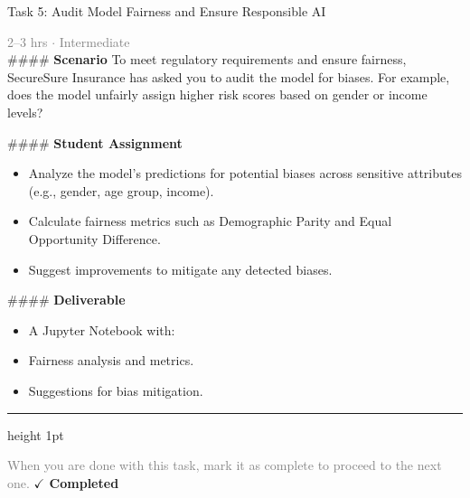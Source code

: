 \documentclass[10pt,a4paper]{article}
\begin{document}
\begin{taskbox}{Task 5: Audit Model Fairness and Ensure Responsible AI}

    {\small \textcolor{gray}{2--3 hrs $\cdot$ Intermediate}}\\[12pt]

    \#\#\#\# \textbf{Scenario}
To meet regulatory requirements and ensure fairness, SecureSure Insurance has asked you to audit the model for biases. For example, does the model unfairly assign higher risk scores based on gender or income levels?

\#\#\#\# \textbf{Student Assignment}
\begin{itemize}
    \item Analyze the model’s predictions for potential biases across sensitive attributes (e.g., gender, age group, income).
    \item Calculate fairness metrics such as Demographic Parity and Equal Opportunity Difference.
    \item Suggest improvements to mitigate any detected biases.
\end{itemize}

\#\#\#\# \textbf{Deliverable}
\begin{itemize}
    \item A Jupyter Notebook with:
    \item Fairness analysis and metrics.
    \item Suggestions for bias mitigation.\par
\end{itemize}

    \vspace{16pt}

    \textcolor{cardBorder}{\hrule height 1pt}\vspace{8pt}

    \small \textcolor{gray}{When you are done with this task, mark it as complete to proceed to the next one.} \hfill \textbf{\textcolor{brandDark}{$\checkmark$ Completed}}

\end{taskbox}
\end{document}
